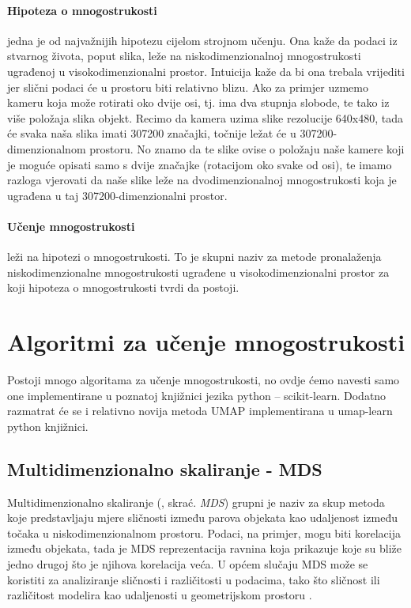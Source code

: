 \documentclass[times, utf8, diplomski]{fer}
\begin{document}
\paragraph{Hipoteza o mnogostrukosti} jedna je od najvažnijih hipotezu cijelom strojnom učenju. Ona kaže da podaci iz stvarnog života, poput slika, leže na niskodimenzionalnoj mnogostrukosti ugrađenoj u visokodimenzionalni prostor. Intuicija kaže da bi ona trebala vrijediti jer slični podaci će u prostoru biti relativno blizu. Ako za primjer uzmemo kameru koja može rotirati oko dvije osi, tj. ima dva stupnja slobode, te tako iz više položaja slika objekt. Recimo da kamera uzima slike rezolucije 640x480, tada će svaka naša slika imati 307200 značajki, točnije ležat će u 307200-dimenzionalnom prostoru. No znamo da te slike ovise o položaju naše kamere koji je moguće opisati samo s dvije značajke (rotacijom oko svake od osi), te imamo razloga vjerovati da naše slike leže na dvodimenzionalnoj mnogostrukosti koja je ugrađena u taj 307200-dimenzionalni prostor.

\paragraph{Učenje mnogostrukosti} leži na hipotezi o mnogostrukosti. To je skupni naziv za metode pronalaženja niskodimenzionalne mnogostrukosti ugrađene u visokodimenzionalni prostor za koji hipoteza o mnogostrukosti tvrdi da postoji.

\section{Algoritmi za učenje mnogostrukosti}

Postoji mnogo algoritama za učenje mnogostrukosti, no ovdje ćemo navesti samo one implementirane u poznatoj knjižnici jezika python – scikit-learn. Dodatno razmatrat će se i relativno novija metoda UMAP implementirana u umap-learn python knjižnici.

\subsection{Multidimenzionalno skaliranje - MDS}

Multidimenzionalno skaliranje (, skrać. \emph{MDS}) grupni je naziv za skup metoda koje predstavljaju mjere sličnosti između parova objekata kao udaljenost između točaka u niskodimenzionalnom prostoru. Podaci, na primjer, mogu biti korelacija između objekata, tada je MDS reprezentacija ravnina koja prikazuje koje su bliže jedno drugoj što je njihova korelacija veća. U općem slučaju MDS može se koristiti za analiziranje sličnosti i različitosti u podacima, tako što sličnost ili različitost modelira kao udaljenosti u geometrijskom prostoru \citep{borg2005modern}.
\end{document}
